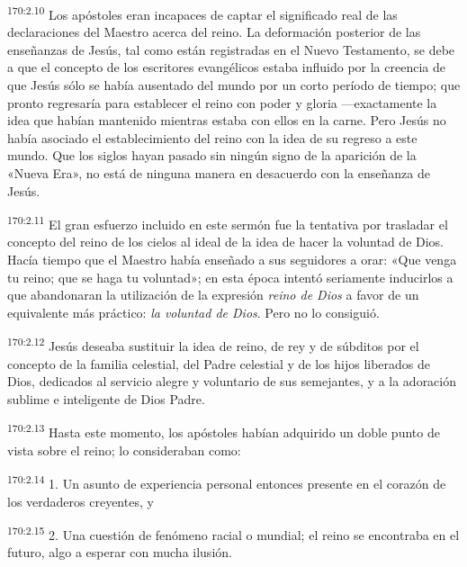 \par 
\textsuperscript{170:2.10} Los apóstoles eran incapaces de captar el significado real de las declaraciones del Maestro acerca del reino. La deformación posterior de las enseñanzas de Jesús, tal como están registradas en el Nuevo Testamento, se debe a que el concepto de los escritores evangélicos estaba influido por la creencia de que Jesús sólo se había ausentado del mundo por un corto período de tiempo; que pronto regresaría para establecer el reino con poder y gloria ---exactamente la idea que habían mantenido mientras estaba con ellos en la carne. Pero Jesús no había asociado el establecimiento del reino con la idea de su regreso a este mundo. Que los siglos hayan pasado sin ningún signo de la aparición de la «Nueva Era», no está de ninguna manera en desacuerdo con la enseñanza de Jesús.

\par 
\textsuperscript{170:2.11} El gran esfuerzo incluido en este sermón fue la tentativa por trasladar el concepto del reino de los cielos al ideal de la idea de hacer la voluntad de Dios. Hacía tiempo que el Maestro había enseñado a sus seguidores a orar: «Que venga tu reino; que se haga tu voluntad»; en esta época intentó seriamente inducirlos a que abandonaran la utilización de la expresión \textit{reino de Dios} a favor de un equivalente más práctico: \textit{la voluntad de Dios}. Pero no lo consiguió.

\par 
\textsuperscript{170:2.12} Jesús deseaba sustituir la idea de reino, de rey y de súbditos por el concepto de la familia celestial, del Padre celestial y de los hijos liberados de Dios, dedicados al servicio alegre y voluntario de sus semejantes, y a la adoración sublime e inteligente de Dios Padre.

\par 
\textsuperscript{170:2.13} Hasta este momento, los apóstoles habían adquirido un doble punto de vista sobre el reino; lo consideraban como:

\par 
\textsuperscript{170:2.14} 1. Un asunto de experiencia personal entonces presente en el corazón de los verdaderos creyentes, y

\par 
\textsuperscript{170:2.15} 2. Una cuestión de fenómeno racial o mundial; el reino se encontraba en el futuro, algo a esperar con mucha ilusión.


